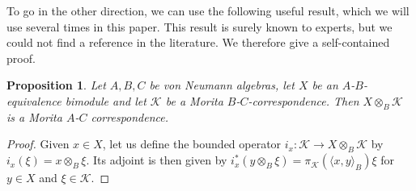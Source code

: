 \documentclass[reqno]{amsart}
\numberwithin{equation}{section}
\newtheorem{Prop}[Theorem]{Proposition}
\begin{document}
To go in the other direction, we can use the following useful result, which we will use several times in this paper. This result is surely known to experts, but we could not find a reference in the literature. We therefore give a self-contained proof.

\begin{Prop}\label{technical}
    Let $A,B,C$ be von Neumann algebras, let $X$ be an $A$-$B$-equivalence bimodule and let $\mathcal{K}$ be a Morita $B$-$C$-correspondence. Then  $X\otimes_B \mathcal{K}$ is a Morita $A$-$C$ correspondence.
\end{Prop}
\begin{proof}
    Given $x\in X$, let us define the bounded operator 
    $i_x: \mathcal{K}\to X\otimes_B \mathcal{K}$ by $i_x(\xi) = x\otimes_B \xi$. Its adjoint is then given by $i_x^*(y \otimes_B \xi) = \pi_\mathcal{K}(\langle x,y\rangle_B) \xi$ for $y\in X$ and $\xi \in \mathcal{K}$.


\end{proof}
\end{document}
